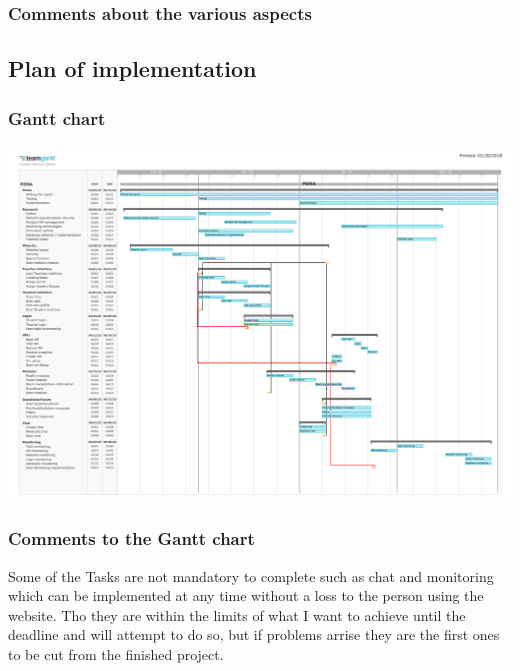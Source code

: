 \documentclass{article}
\begin{document}
\subsubsection{\textbf{Comments about the various aspects}}

\subsection{\textbf{Plan of implementation}}
\subsubsection{\textbf{Gantt chart}}

\newpage

\begin{center}
\includegraphics[scale=0.5]{Gantt.PNG}
\end{center}

\subsubsection{\textbf{Comments to the Gantt chart}}
Some of the Tasks are not mandatory to complete such as chat and monitoring which can be implemented at any time without a loss to the person using the website. 
Tho they are within the limits of what I want to achieve until the deadline and will attempt to do so, but if problems arrise they are the first ones to be cut from the finished project.
\end{document}
